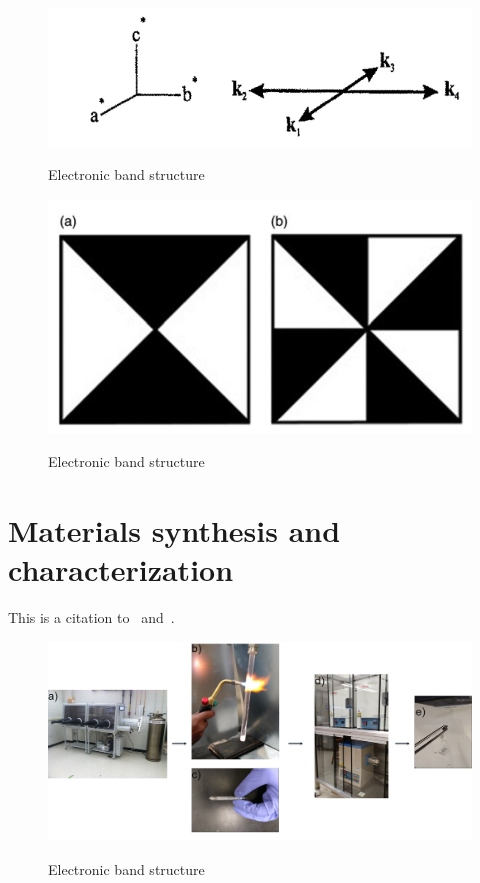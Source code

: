 \documentclass[11pt,edeposit,draftthesis]{uiucthesis2020}
\begin{document}
\begin{mainmatter}
\begin{figure}
\centering\includegraphics[width=0.7\columnwidth]{figures/ch3/star_of_propagation_vector_k.png} \\
\caption{\label{fig:star}
Electronic band structure
}
\end{figure}

\begin{figure}
\centering\includegraphics[width=0.5\columnwidth]{figures/ch3/symmetry_based_analysis.png} \\
\caption{\label{fig:symmetry_based_analysis}
Electronic band structure
}
\end{figure}

\Blindtext[6]

\chapter{Materials synthesis and characterization}

This is a citation to~\cite{Walker2015} and~\cite{Hager2006}.

\begin{figure}
\centering\includegraphics[width=\columnwidth]{figures/ch4/synthesis_procedure.png} \\
\caption{\label{fig:synthesis_procedure}
Electronic band structure
}
\end{figure}


\end{mainmatter}
\end{document}
